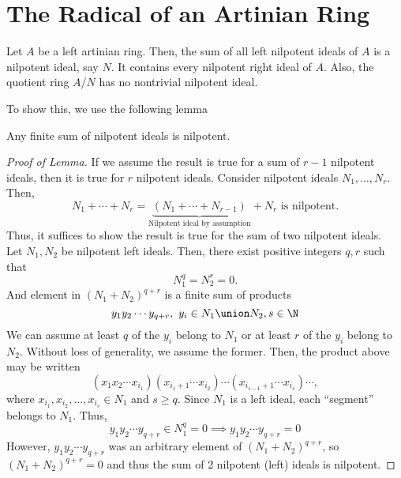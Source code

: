 \documentclass[11pt,leqno,oneside]{amsbook}
\numberwithin{thm}{section}
\begin{document}
\section{The Radical of an Artinian Ring}
\begin{thm}
  Let \(A\) be a left artinian ring. Then, the sum of all left nilpotent
  ideals of \(A\) is a nilpotent ideal, say \(N\). It contains every
  nilpotent right ideal of \(A\). Also, the quotient ring \(A/N\) has
  no nontrivial nilpotent ideal.
\end{thm}
To show this, we use the following lemma
\begin{lem}
  Any finite sum of nilpotent ideals is nilpotent.
\end{lem}
\begin{proof}[Proof of Lemma]
  If we assume the result is true for a sum of \(r-1\) nilpotent
  ideals, then it is true for \(r\) nilpotent ideals. Consider
  nilpotent ideals \(N_1, \ldots, N_r\). Then, \[
    N_1 + \cdots + N_r = \underbrace{(N_1 + \cdots +
      N_{r-1})}_{\text{Nilpotent ideal by assumption}} + N_r \text{ is
    nilpotent.}
  \]
  Thus, it suffices to show the result is true for the sum of two
  nilpotent ideals. \\

  Let \(N_1, N_2\) be nilpotent left ideals. Then, there exist
  positive integers \(q,r\) such that \[
    N_1^q = N_2^r = 0.
  \]
  And element in \((N_1 + N_2)^{q+r}\) is a finite sum of products \[
    y_1 y_2 \cdots y_{q+r}, \ y_i \in N_1 \union N_2, s \in \N
  \]
  We can assume at least \(q\) of the \(y_i\) belong to \(N_1\) or at
  least \(r\) of the \(y_i\) belong to \(N_2\). Without loss of
  generality, we assume the
  former. Then, the product above may be written \[
    (x_1 x_2 \cdots x_{i_1})(x_{i_1 + 1} \cdots x_{i_2}) \cdots
    (x_{i_{s-1}+1} \cdots x_{i_s}) \cdots, 
  \]
  where \(x_{i_1}, x_{i_2}, \ldots,
  x_{i_s} \in N_1\) and \(s \geq q\). Since \(N_1\) is a left ideal,
  each ``segment'' belongs to \(N_1\). Thus, \[
    y_1 y_2 \cdots y_{q+r} \in N_1^q = 0  \implies y_1 y_2 \cdots
    y_{q+r} = 0
  \]
  However, \(y_1 y_2 \cdots y_{q+r}\) was an arbitrary element of
  \((N_1 + N_2)^{q+r}\), so \((N_1 + N_2)^{q+r} = 0\) and thus the sum
  of 2 nilpotent (left) ideals is nilpotent.
\end{proof}
\end{document}
